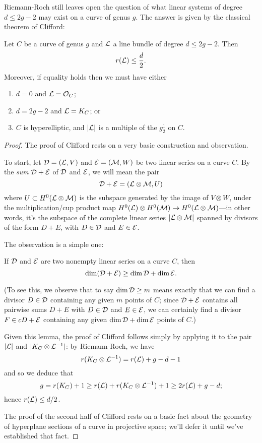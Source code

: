 Riemann-Roch still leaves open the question of what linear systems of degree $d \leq 2g-2$ may exist on a curve of genus $g$. The answer is given by the classical theorem of Clifford:

\begin{theorem}\label{Clifford}
Let $C$ be a curve of genus $g$ and $\cL$ a line bundle of degree $d \leq 2g-2$. Then
$$
r(\cL) \leq \frac{d}{2}.
$$
Moreover, if  equality holds then we must have either
\begin{enumerate}
\item $d=0$ and $\cL = \cO_C$;
\item $d = 2g-2$ and $\cL = K_C$; or
\item $C$ is hyperelliptic, and $|\cL|$ is a multiple of the $g^1_2$ on $C$.
\end{enumerate}
\end{theorem}

\begin{proof}
The proof of Clifford rests on a very basic construction and observation. 

To start, let $\cD = (\cL,V)$ and $\cE = (\cM, W)$ be two linear series on a curve $C$. By the \emph{sum} $\cD + \cE$ of $\cD$ and $\cE$, we will mean the pair 
$$
\cD + \cE = (\cL \otimes \cM, U) 
$$
where $U \subset H^0(\cL \otimes \cM)$ is the subspace generated by the image of $V \otimes W$, under the multiplication/cup product map $H^0(\cL) \otimes H^0(\cM) \to H^0(\cL \otimes \cM)$---in other words, it's the subspace of the complete linear series $|\cL\otimes \cM|$ spanned by divisors of the form $D+E$, with $D \in \cD$ and $E \in \cE$.

The observation is a simple one:
\begin{lemma}
If $\cD$ and $\cE$ are two nonempty linear series on a curve $C$, then
$$
\dim(\cD + \cE) \geq \dim \cD + \dim \cE.
$$
\end{lemma}
(To see this, we observe that to say $\dim \cD \geq m$ means exactly that we can find a divisor $D \in \cD$ containing any given $m$ points of $C$; since $\cD + \cE$ contains all pairwise sums $D + E$ with $D \in \cD$ and $E \in \cE$, we can certainly find a divisor $F \in cD + \cE$ containing any given $\dim \cD + \dim \cE$ points of $C$.)

Given this lemma, the proof of Clifford follows simply by applying it to the pair $|\cL|$ and $|K_C\otimes \cL^{-1}|$: by Riemann-Roch, we have
$$
r(K_C\otimes \cL^{-1}) = r(\cL) +g - d - 1
$$
and so we deduce that
$$
g = r(K_C) + 1 \geq r(\cL) + r(K_C\otimes \cL^{-1}) + 1 \geq 2r(\cL) +g - d;
$$
hence $r(\cL) \leq d/2$.

The proof of the second half of Clifford rests on a basic fact about the geometry of hyperplane sections of a curve in projective space; we'll defer it until we've established that fact.
\end{proof}

